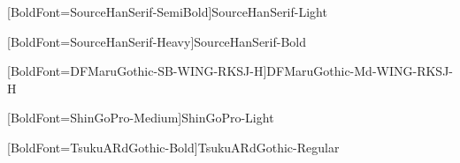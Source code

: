 \newfontfamily{}
[BoldFont={SourceHanSerif-SemiBold}]{SourceHanSerif-Light}
\newcommand{\mincho}{\minchoe\CJKfamily{mincho}}

\newfontfamily{}
[BoldFont={SourceHanSerif-Heavy}]{SourceHanSerif-Bold}
\newcommand{\minchob}{\minchobe\CJKfamily{minchob}}

\newfontfamily{}
[BoldFont={DFMaruGothic-SB-WING-RKSJ-H}]{DFMaruGothic-Md-WING-RKSJ-H}
\newcommand{\maru}{\marue\CJKfamily{maru}}

\newfontfamily{}
[BoldFont={ShinGoPro-Medium}]{ShinGoPro-Light}
\newcommand{\shingo}{\shingoe\CJKfamily{shingo}}

\newfontfamily{}
\newcommand{\outai}{\outaie\CJKfamily{outai}}

\newfontfamily{}
[BoldFont={TsukuARdGothic-Bold}]{TsukuARdGothic-Regular}
\newcommand{\tsuku}{\tsukue\CJKfamily{tsuku}}

\newcommand{\Chapter}[1]{\chapter*{#1\markboth{#1}{}}\addcontentsline{toc}{chapter}{#1}}
\renewcommand{\B}[1]{{\bfseries{#1}}}
